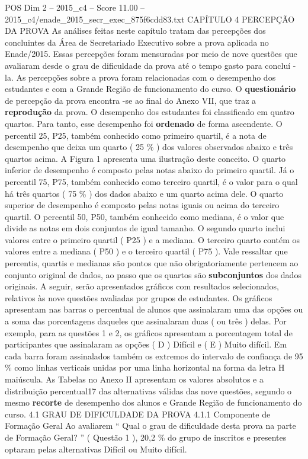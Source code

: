 \begin{textsample}{POS Dim 2 – 2015\_c4 – Score 11.00 – 2015\_c4/enade\_2015\_secr\_exec\_875f6cdd83.txt}  \label{ex:f2_pos_087}
CAPÍTULO 4 PERCEPÇÃO DA PROVA As análises feitas neste capítulo tratam das percepções dos concluintes da Área de Secretariado Executivo sobre a prova aplicada no Enade/2015.
Essas percepções foram mensuradas por meio de nove questões que avaliaram desde o grau de dificuldade da prova até o tempo gasto para concluí -la.
As percepções sobre a prova foram relacionadas com o desempenho dos estudantes e com a Grande Região de funcionamento do curso.
O \textbf{questionário} de percepção da prova encontra -se ao final do Anexo VII, que traz a \textbf{reprodução} da prova.
O desempenho dos estudantes foi classificado em quatro quartos.
Para tanto, esse desempenho foi \textbf{ordenado} de forma ascendente.
O percentil 25, P25, também conhecido como primeiro quartil, é a nota de desempenho que deixa um quarto ( 25 \% ) dos valores observados abaixo e três quartos acima.
A Figura 1 apresenta uma ilustração deste conceito.
O quarto inferior de desempenho é composto pelas notas abaixo do primeiro quartil.
Já o percentil 75, P75, também conhecido como terceiro quartil, é o valor para o qual há três quartos ( 75 \% ) dos dados abaixo e um quarto acima dele.
O quarto superior de desempenho é composto pelas notas iguais ou acima do terceiro quartil.
O percentil 50, P50, também conhecido como mediana, é o valor que divide as notas em dois conjuntos de igual tamanho.
O segundo quarto inclui valores entre o primeiro quartil ( P25 ) e a mediana.
O terceiro quarto contém os valores entre a mediana ( P50 ) e o terceiro quartil ( P75 ).
Vale ressaltar que percentis, quartis e medianas são pontos que não obrigatoriamente pertencem ao conjunto original de dados, ao passo que os quartos são \textbf{subconjuntos} dos dados originais.
A seguir, serão apresentados gráficos com resultados selecionados, relativos às nove questões avaliadas por grupos de estudantes.
Os gráficos apresentam nas barras o percentual de alunos que assinalaram uma das opções ou a soma das porcentagens daqueles que assinalaram duas ( ou três ) delas.
Por exemplo, para as questões 1 e 2, os gráficos apresentam a porcentagem total de participantes que assinalaram as opções ( D ) Difícil e ( E ) Muito difícil.
Em cada barra foram assinalados também os extremos do intervalo de confiança de 95 \% como linhas verticais unidas por uma linha horizontal na forma da letra H maiúscula.
As Tabelas no Anexo II apresentam os valores absolutos e a distribuição percentual17 das alternativas válidas das nove questões, segundo o mesmo \textbf{recorte} de desempenho dos alunos e Grande Região de funcionamento do curso. 4.1 GRAU DE DIFICULDADE DA PROVA 4.1.1 Componente de Formação Geral Ao avaliarem “ Qual o grau de dificuldade desta prova na parte de Formação Geral? ” ( Questão 1 ), 20,2 \% do grupo de inscritos e presentes optaram pelas alternativas Difícil ou Muito difícil.

\end{textsample}
